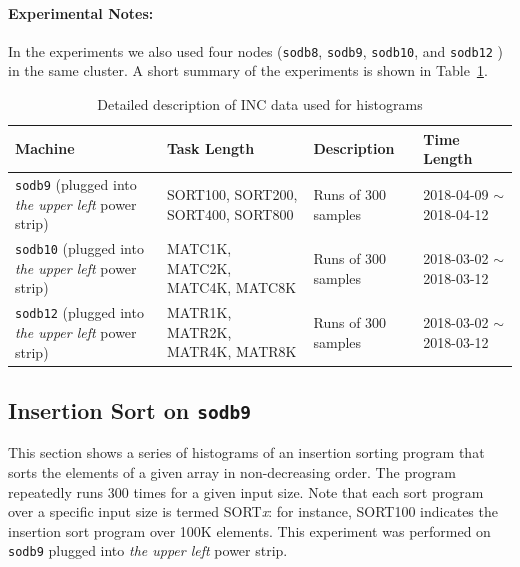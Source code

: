 \documentclass[10pt]{article}
\begin{document}
\paragraph{Experimental Notes:} In the experiments 
we also used four nodes ({\tt sodb8}, {\tt sodb9}, {\tt sodb10}, and {\tt sodb12} ) in the same cluster. 
A short summary of the experiments is shown in Table~\ref{tab:exp_notes}.

\begin{table}[h]
\begin{center}
\begin{tabular}{|p{4cm}|p{3cm}|p{4cm}|p{4cm}|} \hline
Machine & Task Length & Description & Time Length\\ \hline
{\tt sodb9}  (plugged into {\em the upper left} power strip) & SORT100, SORT200, SORT400, SORT800 & Runs of 300 samples & 2018-04-09 $\sim$2018-04-12\\ \hline
{\tt sodb10} (plugged into {\em the upper left} power strip)  & MATC1K, MATC2K, MATC4K, MATC8K & Runs of 300 samples & 2018-03-02 $\sim$2018-03-12 \\ \hline
{\tt sodb12} (plugged into {\em the upper left} power strip) & MATR1K, MATR2K, MATR4K, MATR8K& Runs of 300 samples & 2018-03-02 $\sim$2018-03-12 \\ \hline
\end{tabular}
\end{center}
\vspace{-.2in}
\caption{Detailed description of INC data used for histograms\label{tab:exp_notes}}
\end{table}


\clearpage
\pagebreak

\subsection{Insertion Sort on {\tt sodb9}~\label{sec:new_ins_sort}} 
This section shows a series of histograms of an insertion sorting program that 
sorts the elements of a given array in non-decreasing order. 
The program repeatedly runs 300 times for a given input size. 
Note that each sort program over a specific input size is termed SORT{\it x}: 
for instance, SORT100 indicates the insertion sort program over 100K elements. 
This experiment was performed on {\tt sodb9} plugged into {\em the upper left} power strip.
\end{document}
